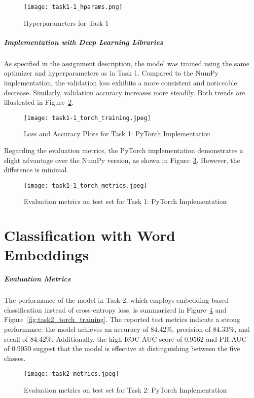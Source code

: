 \documentclass[10pt,a4paper,twoside]{article}
\begin{document}
\begin{figure}[h]
    \centering
    \texttt{[image: task1-1\_hparams.png]} 
    \caption{Hyperparameters for Task 1}
    \label{fig:task1_hparams}
\end{figure}

\subparagraph{Implementation with Deep Learning Libraries} As specified in the assignment description, the model was trained using the same optimizer and hyperparameters as in Task 1. Compared to the NumPy implementation, the validation loss exhibits a more consistent and noticeable decrease. Similarly, validation accuracy increases more steadily. Both trends are illustrated in Figure~\ref{fig:task1_torch_train}.

\begin{figure}[h]
    \centering
    \texttt{[image: task1-1\_torch\_training.jpeg]} 
    \caption{Loss and Accuracy Plots for Task 1: PyTorch Implementation}
    \label{fig:task1_torch_train}
\end{figure}

Regarding the evaluation metrics, the PyTorch implementation demonstrates a slight advantage over the NumPy version, as shown in Figure~\ref{fig:task1_torch_metrics}. However, the difference is minimal.

\begin{figure}[h]
    \centering
    \texttt{[image: task1-1\_torch\_metrics.jpeg]} 
    \caption{Evaluation metrics on test set for Task 1: PyTorch Implementation}
    \label{fig:task1_torch_metrics}
\end{figure}

\section{Classification with Word Embeddings}
\subparagraph{Evaluation Metrics}
The performance of the model in Task 2, which employs embedding-based classification instead of cross-entropy loss, is summarized in Figure~\ref{fig:task2_torch_metrics} and Figure~\ref{fig:task2_torch_training}. The reported test metrics indicate a strong performance: the model achieves an accuracy of 84.42\%, precision of 84.33\%, and recall of 84.42\%. Additionally, the high ROC AUC score of 0.9562 and PR AUC of 0.9050 suggest that the model is effective at distinguishing between the five classes.

\begin{figure}[h]
    \centering
    \texttt{[image: task2-metrics.jpeg]} 
    \caption{Evaluation metrics on test set for Task 2: PyTorch Implementation}
    \label{fig:task2_torch_metrics}
\end{figure}
\end{document}

